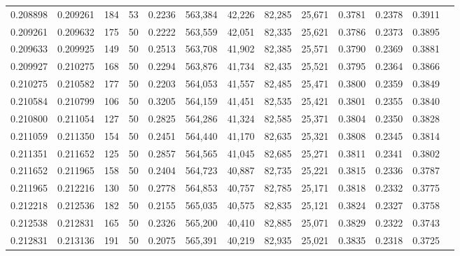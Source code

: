 \begin{tabular}{rrrrrrrrrrrrr}
0.208898 & 0.209261 &   184 &  53 &                                     0.2236 & 563,384 &  42,226 &  82,285 &  25,671 & 0.3781 & 0.2378 & 0.3911 \\
0.209261 & 0.209632 &   175 &  50 &                                     0.2222 & 563,559 &  42,051 &  82,335 &  25,621 & 0.3786 & 0.2373 & 0.3895 \\
0.209633 & 0.209925 &   149 &  50 &                                     0.2513 & 563,708 &  41,902 &  82,385 &  25,571 & 0.3790 & 0.2369 & 0.3881 \\
0.209927 & 0.210275 &   168 &  50 &                                     0.2294 & 563,876 &  41,734 &  82,435 &  25,521 & 0.3795 & 0.2364 & 0.3866 \\
0.210275 & 0.210582 &   177 &  50 &                                     0.2203 & 564,053 &  41,557 &  82,485 &  25,471 & 0.3800 & 0.2359 & 0.3849 \\
0.210584 & 0.210799 &   106 &  50 &                                     0.3205 & 564,159 &  41,451 &  82,535 &  25,421 & 0.3801 & 0.2355 & 0.3840 \\
0.210800 & 0.211054 &   127 &  50 &                                     0.2825 & 564,286 &  41,324 &  82,585 &  25,371 & 0.3804 & 0.2350 & 0.3828 \\
0.211059 & 0.211350 &   154 &  50 &                                     0.2451 & 564,440 &  41,170 &  82,635 &  25,321 & 0.3808 & 0.2345 & 0.3814 \\
0.211351 & 0.211652 &   125 &  50 &                                     0.2857 & 564,565 &  41,045 &  82,685 &  25,271 & 0.3811 & 0.2341 & 0.3802 \\
0.211652 & 0.211965 &   158 &  50 &                                     0.2404 & 564,723 &  40,887 &  82,735 &  25,221 & 0.3815 & 0.2336 & 0.3787 \\
0.211965 & 0.212216 &   130 &  50 &                                     0.2778 & 564,853 &  40,757 &  82,785 &  25,171 & 0.3818 & 0.2332 & 0.3775 \\
0.212218 & 0.212536 &   182 &  50 &                                     0.2155 & 565,035 &  40,575 &  82,835 &  25,121 & 0.3824 & 0.2327 & 0.3758 \\
0.212538 & 0.212831 &   165 &  50 &                                     0.2326 & 565,200 &  40,410 &  82,885 &  25,071 & 0.3829 & 0.2322 & 0.3743 \\
0.212831 & 0.213136 &   191 &  50 &                                     0.2075 & 565,391 &  40,219 &  82,935 &  25,021 & 0.3835 & 0.2318 & 0.3725 \\

\end{tabular}
